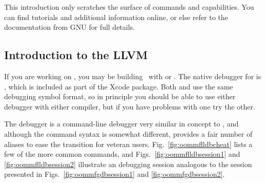 This introduction only scratches the surface of  commands and
capabilities. You can find tutorials and additional information online,
or else refer to the  documentation from GNU for full details.

\subsection{Introduction to the LLVM }\label{sec:debug:lldbintro}
If you are working on \MacOSX, you may be building \OOMMF\ with
 or . The native debugger for  is
, which is included as part of the Xcode package. Both
 and  use the same debugging symbol format, so in
principle you should be able to use either debugger with either
compiler, but if you have problems with one try the other.

The  debugger is a command-line debugger very similar in
concept to , and although the command syntax is somewhat
different,  provides a fair number of aliases to ease the
transition for veteran  users.  Fig.~\ref{fig:oommflldbcheat}
lists a few of the more common  commands, and
Figs.~\ref{fig:oommflldbsession1} and \ref{fig:oommflldbsession2}
illustrate an  debugging session analogous to the 
session presented in Figs.~\ref{fig:oommfgdbsession1} and
\ref{fig:oommfgdbsession2}.

\newcommand{\dblhyp}{\texttt{-}\texttt{-}}

